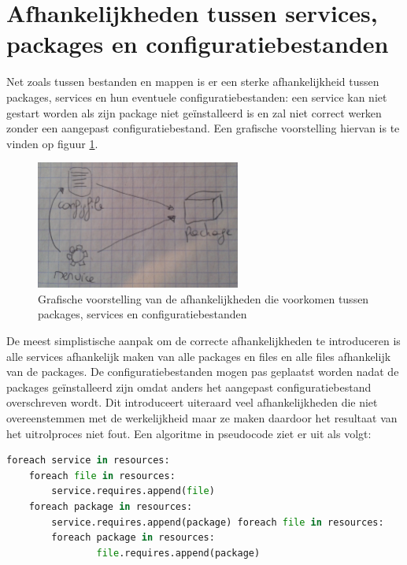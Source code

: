 \section{Afhankelijkheden tussen services, packages en configuratiebestanden}
\label{sec:services_packages_en_configuratiebestanden}
Net zoals tussen bestanden en mappen is er een sterke afhankelijkheid tussen packages, services en hun eventuele configuratiebestanden:
een service kan niet gestart worden als zijn package niet ge\"installeerd is en zal niet correct werken zonder een aangepast configuratiebestand.
Een grafische voorstelling hiervan is te vinden op figuur \ref{fig:service_package_dep}.

\begin{figure}[h]
    \begin{center}
    \includegraphics[width=0.6\textwidth]{images/service_package_dep.png}
    \caption{Grafische voorstelling van de afhankelijkheden die voorkomen tussen packages, services en configuratiebestanden}
    \label{fig:service_package_dep}
    \end{center}
\end{figure}

De meest simplistische aanpak om de correcte afhankelijkheden te introduceren is alle services afhankelijk maken van alle packages en files en alle files afhankelijk van de packages.
De configuratiebestanden mogen pas geplaatst worden nadat de packages ge\"installeerd zijn omdat anders het aangepast configuratiebestand overschreven wordt.
Dit introduceert uiteraard veel afhankelijkheden die niet overeenstemmen met de werkelijkheid maar ze maken daardoor het resultaat van het uitrolproces niet fout.
Een algoritme in pseudocode ziet er uit als volgt:

\begin{minipage}{\textwidth}
\begin{lstlisting}[language=Python]
foreach service in resources:
    foreach file in resources:
        service.requires.append(file)
    foreach package in resources:
        service.requires.append(package) foreach file in resources:
		foreach package in resources:
				file.requires.append(package)
\end{lstlisting}
\end{minipage}

